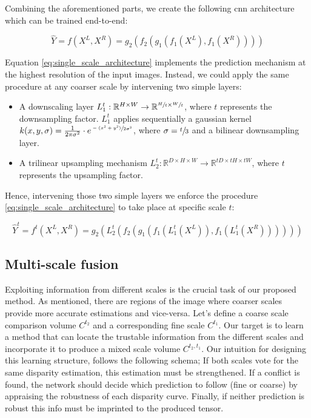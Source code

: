 \documentclass[10pt]{article}
\begin{document}
Combining the aforementioned parts, we create the following cnn architecture which can be trained end-to-end:

\begin{equation} \label{eq:single_scale_architecture}
    \hat{Y} = f(X^L, X^R) = g_2 ( f_2 ( g_1 ( f_1(X^L), f_1(X^R) ) ) )
\end{equation}

Equation \ref{eq:single_scale_architecture} implements the prediction mechanism at the highest resolution of the input images. Instead, we could apply the same procedure at any coarser scale by intervening two simple layers:

\begin{itemize}
    \item A downscaling layer $L_1^t: \mathbb{R}^{H \times W} \rightarrow \mathbb{R}^{\sfrac{H}{t} \times \sfrac{W}{t}}$, where $t$ represents the downsampling factor. $L_1^t$ applies sequentially a gaussian kernel $k(x, y, \sigma) = \frac{1}{2\pi\sigma^2} \cdot e^{\sfrac{-(x^2 + y^2)}{2\sigma^2}}$, where $\sigma = \sfrac{t}{3}$ and a bilinear downsampling layer.
    
    \item A trilinear upsampling mechanism $L_2^t: \mathbb{R}^{D \times H \times W} \rightarrow \mathbb{R}^{tD \times tH \times tW}$, where $t$ represents the upsampling factor.
\end{itemize}

Hence, intervening those two simple layers we enforce the procedure \ref{eq:single_scale_architecture} to take place at specific scale $t$:

\begin{equation} \label{eq:single_scale_archtecture_at_sigma}
    \hat{Y}^t = f^t(X^L, X^R) = g_2( L_2^t (f_2 ( g_1 ( f_1(L_1^t(X^L)), f_1(L_1^t(X^R)) ) ) ) )
\end{equation}


\subsection{Multi-scale fusion}

Exploiting information from different scales is the crucial task of our proposed method. As mentioned, there are regions of the image where coarser scales provide more accurate estimations and vice-versa. Let's define a coarse scale comparison volume $C^{t_2}$ and a corresponding fine scale $C^{t_1}$. Our target is to learn a method that can locate the trustable information from the different scales and incorporate it to produce a mixed scale volume $C^{t_2, t_1}$. Our intuition for designing this learning structure, follows the following schema; If both scales vote for the same disparity estimation, this estimation must be strengthened. If a conflict is found, the network should decide which prediction to follow (fine or coarse) by appraising the robustness of each disparity curve. Finally, if neither prediction is robust this info must be imprinted to the produced tensor.
\end{document}
